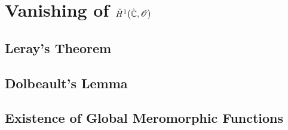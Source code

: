\documentclass[../Moduli_Spaces_of_Riemann_Surfaces.tex]{subfiles}
\begin{document}
    \section{Vanishing of $\check{H}^1\big(\hat{\mathbb{C}},\mathscr{O}\big)$}
    \subsection{Leray's Theorem}
    \subsection{Dolbeault's Lemma}
    \subsection{Existence of Global Meromorphic Functions}
\end{document}
